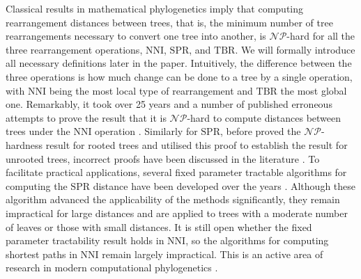 \documentclass[11pt]{amsart}
\newcommand{\nni}{\mathrm{NNI}}
\newcommand{\spr}{\mathrm{SPR}}
\newcommand{\tbr}{\mathrm{TBR}}
\newcommand{\np}{\mathcal{NP}}
\newcommand{\summary}[1]{} %
\begin{document}
\summary{Motivation: However, all known graph-based tree rearrangement distances, including NNI, are NP-hard, and it took many years and paper to prove that; so approach such as practical FPT algorithms is an active area of research to overcome the computational (cite Whidden).}
Classical results in mathematical phylogenetics imply that computing rearrangement distances between trees, that is, the minimum number of tree rearrangements necessary to convert one tree into another, is $\np$-hard \autocite{Dasgupta2000-xa, Bordewich2005-nx, Hickey2008-wv, Allen2001-ky, todo} for all the three rearrangement operations, $\nni$, $\spr$, and $\tbr$.
We will formally introduce all necessary definitions later in the paper.
Intuitively, the difference between the three operations is how much change can be done to a tree by a single operation, with $\nni$ being the most local type of rearrangement and $\tbr$ the most global one.
Remarkably, it took over 25 years and a number of published erroneous attempts \autocite{todo} to prove the result that it is $\np$-hard to compute distances between trees under the $\nni$ operation \autocite{Dasgupta2000-xa}.
Similarly for $\spr$, before \textcite{Bordewich2005-nx} proved the $\np$-hardness result for rooted trees and \textcite{Hickey2008-wv} utilised this proof to establish the result for unrooted trees, incorrect proofs have been discussed in the literature \autocite{Hein1996-em, Allen2001-ky}.
To facilitate practical applications, several fixed parameter tractable algorithms for computing the $\spr$ distance have been developed over the years \autocite{Whidden2010-bw, Bordewich2005-nx, Whidden2018-fw}.
Although these algorithm advanced the applicability of the methods significantly, they remain impractical for large distances and are applied to trees with a moderate number of leaves or those with small distances.
It is still open whether the fixed parameter tractability result holds in $\nni$, so the algorithms for computing shortest paths in $\nni$ remain largely impractical.
This is an active area of research in modern computational phylogenetics \autocite{Gavryushkin2018-ol}.
\end{document}
